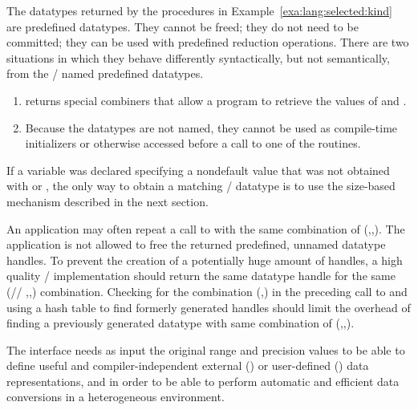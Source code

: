 \begin{users}
The datatypes returned by the procedures in Example~\ref{exa:lang:selected:kind} are
predefined datatypes. They cannot be freed; they do not need to be
committed; they can be used with predefined reduction operations.
There are two situations in which they behave differently syntactically,
but not semantically, from the \MPI/ named predefined datatypes.
\begin{enumerate}
\item {} returns special
combiners that allow a program to retrieve the values of
 and .
\item Because the datatypes are not named, they cannot
be used as compile-time initializers or otherwise
accessed before a call to one of the 
routines.
\end{enumerate}
If a variable was declared specifying a nondefault  value that was
not obtained with   or
, the only way to obtain a matching
\MPI/ datatype is to use the size-based mechanism described
in the next section.
\end{users}

\begin{implementors}
An application may often repeat a call to
 with the same combination of
(\mpishortarg{\XXX/},,).
The application is not allowed to free the returned predefined, unnamed
datatype handles. To prevent the creation of a potentially huge amount of handles,
a high quality
\MPI/ implementation should return the same datatype handle for
the same
(// ,,)
combination.
Checking for the
combination (,) in the preceding call to
 and
using a hash table to find formerly generated handles should limit the
overhead of finding a previously generated datatype with same combination
of (\mpishortarg{\XXX/},,).
\end{implementors}

\begin{rationale}
%
%
%
\sloppy %
The  interface
needs as input the original range and precision values to be able to
define useful and compiler-independent
external ()
or user-defined () data representations, and in
order to be able to perform automatic and efficient data conversions in a
heterogeneous environment.
\end{rationale}

